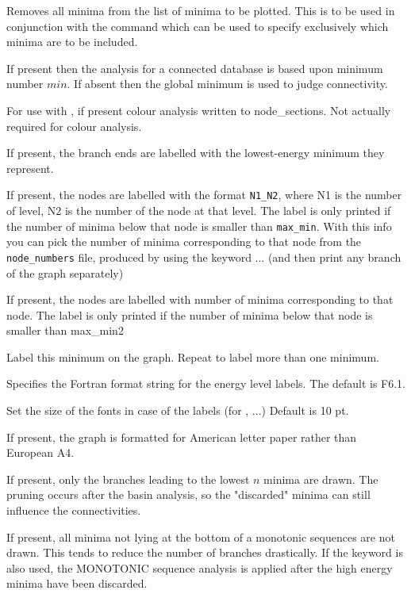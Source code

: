 Removes all minima from the list of minima to be plotted.  This is to be
used in conjunction with the  command which can be used to specify
exclusively which minima are to be included.

If present then the analysis for a connected database is based upon minimum
number $min$. If absent then the global minimum is used to judge connectivity.

For use with , if present colour analysis written to node\_sections.   
Not actually required for colour analysis.

If present, the branch ends are labelled with the lowest-energy minimum
they represent.

If present, the nodes are labelled with the format \verb|N1_N2|, where N1 is the number of level,
N2 is the number of the node at that level. The label is only printed if the
number of minima below that node is smaller than \verb|max_min|. With this info
you can pick the number of minima corresponding to that node from the {\tt \verb|node_numbers|} file,
produced by using the keyword ... (and then print any branch of the graph separately)

If present, the nodes are labelled with number of minima corresponding to that node. 
The label is only printed if the number of minima below that node is smaller than max\_min2

Label this minimum on the graph. Repeat to label more than one minimum.

Specifies the Fortran format string for the energy level labels. The default
is F6.1.

Set the size of the fonts in case of the labels (for ,  ...)
Default is 10 pt.

If present, the graph is formatted for American letter paper rather than
European A4.

If present, only the branches leading to the lowest $n$ minima are drawn. The
pruning occurs after the basin analysis, so the "discarded" minima can still
influence the connectivities.

If present, all minima not lying at the bottom of a monotonic sequences are
not drawn. This tends to reduce the number of branches drastically. If the
keyword  is also used, the MONOTONIC sequence analysis is applied after
the high energy minima have been discarded.

